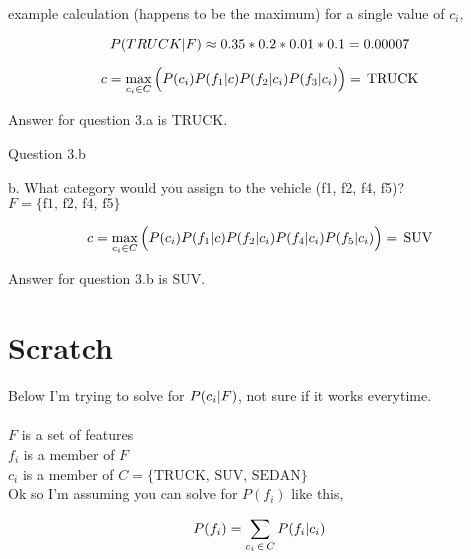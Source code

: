 \documentclass{article}
\begin{document}
example calculation (happens to be the maximum) for a single value of $c_i$,

\begin{equation}
	\nonumber 
	P(TRUCK|F) \approx
	0.35 * 0.2 * 0.01 * 0.1 
	= 0.00007
\end{equation}

\begin{equation}
	\nonumber
 	c
	=
	\max_{c_i \in C} 
	\Big(
	P(c_i) P(f_1|c)P(f_2|c_i)P(f_3|c_i)
	\Big)
	= \, \text{TRUCK}
\end{equation}


Answer for question 3.a is TRUCK.

\begin{center} Question 3.b \end{center}

b. 	What category would you assign to the vehicle (f1, f2, f4, f5)? \\

$F = \{ \text{f1, f2, f4, f5} \}$

\begin{equation}
	\nonumber
 	c
	=
	\max_{c_i \in C} 
	\Big(
	P(c_i) P(f_1|c)P(f_2|c_i)P(f_4|c_i)P(f_5|c_i)
	\Big)
	= \, \text{SUV}
\end{equation}

Answer for question 3.b is SUV.








%
%



\section{Scratch}
Below I'm trying to solve for $P(c_i|F)$, not sure if it works everytime. \\ \\
$F$ is a set of features  \\
$f_i$ is a member of $F$ \\
$c_i$ is a member of $C =  \{ \text{TRUCK, SUV, SEDAN} \}$ \\

Ok so I'm assuming you can solve for $P(f_i)$ like this,

\begin{equation}
	\nonumber P(f_i) = \sum_{c_i \, \in \, C}{P(f_i|c_i)}
\end{equation}
\end{document}
